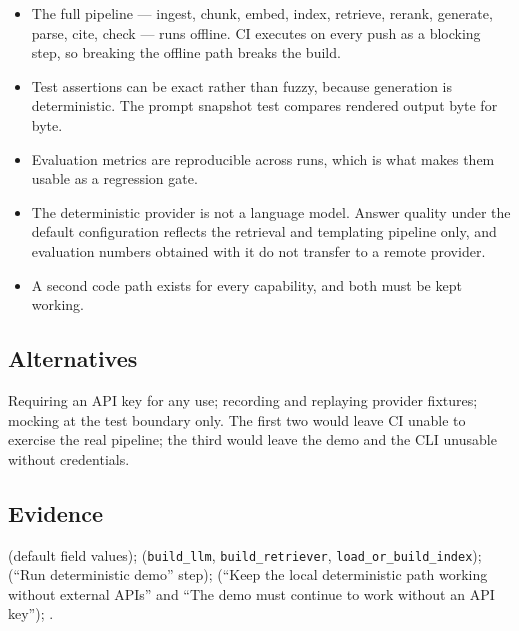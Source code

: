 \begin{itemize}
  \item The full pipeline --- ingest, chunk, embed, index, retrieve, rerank,
    generate, parse, cite, check --- runs offline. CI executes
     on every push as a blocking step, so
    breaking the offline path breaks the build.
  \item Test assertions can be exact rather than fuzzy, because generation is
    deterministic. The prompt snapshot test compares rendered output byte for
    byte.
  \item Evaluation metrics are reproducible across runs, which is what makes
    them usable as a regression gate.
  \item The deterministic provider is not a language model. Answer quality
    under the default configuration reflects the retrieval and templating
    pipeline only, and evaluation numbers obtained with it do not transfer to a
    remote provider.
  \item A second code path exists for every capability, and both must be kept
    working.
\end{itemize}

\subsection*{Alternatives}

Requiring an API key for any use; recording and replaying provider fixtures;
mocking at the test boundary only. The first two would leave CI unable to
exercise the real pipeline; the third would leave the demo and the CLI
unusable without credentials.

\subsection*{Evidence}

 (default field values);
 (\texttt{build\_llm},
\texttt{build\_retriever}, \texttt{load\_or\_build\_index});
 (``Run deterministic demo'' step);
 (``Keep the local deterministic path working without
external APIs'' and ``The demo must continue to work without an API key'');
.
